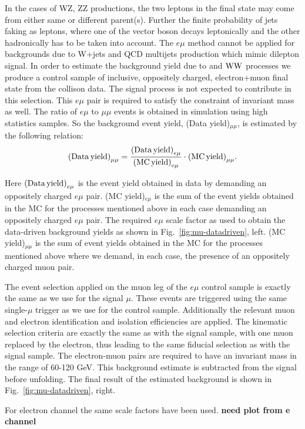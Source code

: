 In the
cases of WZ, ZZ productions, the two leptons in the final state may
come from either same or different parent(s). Further the finite probability
of jets faking as leptons, where one of the vector boson decays leptonically
and the other hadronically has to be taken into account. 
The $e\mu$ method cannot be applied for backgrounds due to W+jets
and QCD multijets production which mimic dilepton signal. In order
to estimate the background yield due to \ttbar and ${\rm  WW}$ processes
we produce a control sample of inclusive, oppositely charged, 
electron+muon final state from the 
collison data. The signal process is not expected to
contribute in this selection. This $e\mu$ pair is required to satisfy
the constraint of invariant mass as well. The ratio of $e\mu$ to
$\mu$$\mu$ events is obtained in simulation using high statistics
samples. So the background event yield, (Data yield)$_{\mu\mu}$,
is estimated by the following relation: 
$${\rm (Data\, yield)}_{\mu\mu} = \frac{{\rm (Data\, yield)}_{e\mu}}{{\rm (MC\, 
yield)}_{e\mu}} \cdot {\rm (MC\, yield)}_{\mu\mu}.$$

Here  ${\rm (Data\, yield)}_{e\mu}$ is the event yield obtained in data by
demanding an oppositely charged $e\mu$ pair. (MC yield)$_{e\mu}$
is the sum of the event yields obtained in the MC for the processes
mentioned above in each case demanding an oppositely charged $e\mu$
pair. The required ${e\mu}$ scale factor as used to obtain the data-driven background yields as shown in Fig.~\ref{fig:mu-datadriven}, left. 
(MC yield)$_{\mu\mu}$ is the sum of event yields obtained in
the MC for the processes mentioned above where we demand, in each
case, the presence of an oppositely charged muon pair.

The event selection
applied on the muon leg of the $e\mu$ control sample is exactly the
same as we use for the signal $\mu$. These events are triggered using
the same single-$\mu$ trigger as we use for the control sample. Additionally
the relevant muon and electron identification and isolation efficiencies
are applied. The kinematic selection criteria
are exactly the same as with the signal sample, with one muon replaced
by the electron, thus leading to the same fiducial selection as with
the signal sample. The electron-muon pairs are required to have an
invariant mass in the range of 60-120 GeV. This background estimate
is subtracted from the signal before unfolding. 
The final result of the estimated
background is shown in Fig.~\ref{fig:mu-datadriven}, right. 

For electron channel the same scale factors have been used.
 {\bf need plot from e channel}

